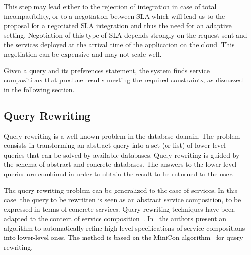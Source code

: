 This step may lead either to the rejection of integration in case of total incompatibility, or to a negotiation between SLA which will lead us to the proposal for a negotiated SLA integration and thus the need for an adaptive setting.
%
%
%
 Negotiation of this type of SLA depends strongly on the request sent and the services deployed at the arrival time of the application on the cloud. This negotiation can be expensive and may not scale well.

 Given a query and its preferences statement, the system  finds  service compositions that produce results   meeting the required constraints, as discussed in the following section.
 
\subsection{Query Rewriting}
\label{sec:queryRew}

Query rewriting is a well-known problem in the database domain.
The problem consists in transforming an abstract query into a set (or list) of lower-level queries that can be solved by  available databases.
Query rewriting is guided by the schema of  abstract and concrete databases.
The answers to the lower level queries are combined in order to obtain the result to be returned to the user.

The query rewriting problem can be generalized to the case of services.
In this case, the query to be rewritten is seen as an abstract service composition, to be expressed in terms of concrete services.
Query rewriting techniques have been adapted to the context of service composition~\cite{BBM10,ZLC11,CostaAMR13}. 
In~\cite{CostaAMR13} the authors present an algorithm to automatically refine high-level specifications of service compositions into lower-level ones. 
The method is based on the MiniCon algorithm~\cite{PH01} for query rewriting.

